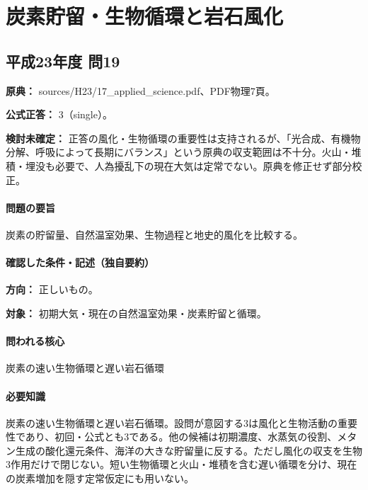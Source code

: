\section{炭素貯留・生物循環と岩石風化}

\subsection{平成23年度 問19}
\label{q:h23-reg-applied-19}

\noindent\textbf{原典：} sources/H23/17\_applied\_science.pdf、PDF物理7頁。

\textbf{公式正答：} 3（single）。

\par\textbf{検討未確定：} 正答の風化・生物循環の重要性は支持されるが、「光合成、有機物分解、呼吸によって長期にバランス」という原典の収支範囲は不十分。火山・堆積・埋没も必要で、人為擾乱下の現在大気は定常でない。原典を修正せず部分校正。

\paragraph{問題の要旨} 炭素の貯留量、自然温室効果、生物過程と地史的風化を比較する。

\paragraph{確認した条件・記述（独自要約）}\mbox{}\par

\noindent\textbf{方向：} 正しいもの。\par

\noindent\textbf{対象：} 初期大気・現在の自然温室効果・炭素貯留と循環。\par

\paragraph{問われる核心} 炭素の速い生物循環と遅い岩石循環

\paragraph{必要知識} 炭素の速い生物循環と遅い岩石循環。設問が意図する3は風化と生物活動の重要性であり、初回・公式とも3である。他の候補は初期濃度、水蒸気の役割、メタン生成の酸化還元条件、海洋の大きな貯留量に反する。ただし風化の収支を生物3作用だけで閉じない。短い生物循環と火山・堆積を含む遅い循環を分け、現在の炭素増加を隠す定常仮定にも用いない。

